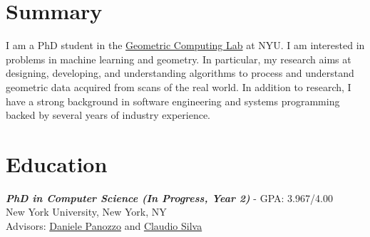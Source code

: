 \documentclass[line,10pt]{res}
\begin{document}
\address{francis@fwilliams.info}
\address{+1-650-701-7891}

\begin{resume}

\vspace{0.2em}
\section{\Large \sc \textbf Summary}
\vspace{0.5em}
I am a PhD student in the \href{https://cims.nyu.edu/gcl/}{Geometric Computing Lab} at NYU. I am interested in problems in machine learning and geometry. In particular, my research aims at designing, developing, and understanding algorithms to process and understand geometric data acquired from scans of the real world. In addition to research, I have a strong background in software engineering and systems programming backed by several years of industry experience.
\vspace{0.5em}






\vspace{0.2em}
\section{\Large \sc \textbf Education}
\vspace{0.5em}

{\sl \textbf{PhD in Computer Science (In Progress, Year 2)}} - GPA: 3.967/4.00 \\ 
New York University, New York, NY \\
Advisors: \href{https://cims.nyu.edu/gcl/daniele.html}{Daniele Panozzo} and \href{https://vgc.poly.edu/~csilva/}{Claudio Silva}



\end{resume}
\end{document}

